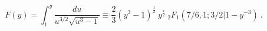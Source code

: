 \begin{equation}
F(y)=\int_1^{y} \frac{du}{u^{3/2}\sqrt{u^3-1}}\equiv \frac 23 
(y^3\!-\!1)^{\frac 
12}\ y^{\frac 72}\ _2F_1(7/6,1;3/2|1\!-\!y^{-3})
\ .
\end{equation}

